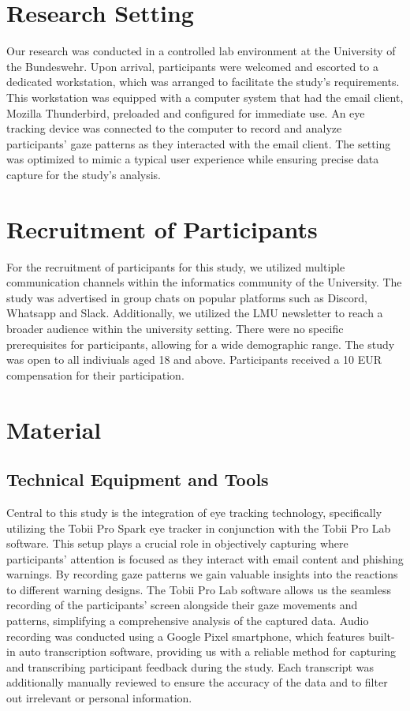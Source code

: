 \documentclass[
  a4paper,  %
  twoside,  %
  bibliography=totoc,
  headsepline,
  cleardoublepage=empty,
  parskip=half,
  draft=false
]{scrbook}
\begin{document}
\section{Research Setting}
Our research was conducted in a controlled lab environment at the University of the Bundeswehr. Upon arrival, participants were welcomed and escorted to a dedicated workstation, which was arranged to facilitate the study's requirements. This workstation was equipped with a computer system that had the email client, Mozilla Thunderbird, preloaded and configured for immediate use. An eye tracking device was connected to the computer to record and analyze participants' gaze patterns as they interacted with the email client. The setting was optimized to mimic a typical user experience while ensuring precise data capture for the study's analysis.

\section{Recruitment of Participants}
For the recruitment of participants for this study, we utilized multiple communication channels within the informatics community of the University. The study was advertised in group chats on popular platforms such as Discord, Whatsapp and Slack. Additionally, we utilized the LMU newsletter to reach a broader audience within the university setting. There were no specific prerequisites for participants, allowing for a wide demographic range. The study was open to all indiviuals aged 18 and above. Participants received a 10 EUR compensation for their participation.

\section{Material}
\subsection{Technical Equipment and Tools}
Central to this study is the integration of eye tracking technology, specifically utilizing the Tobii Pro Spark eye tracker in conjunction with the Tobii Pro Lab software. This setup plays a crucial role in objectively capturing where participants' attention is focused as they interact with email content and phishing warnings. By recording gaze patterns we gain valuable insights into the reactions to different warning designs. The Tobii Pro Lab software allows us the seamless recording of the participants' screen alongside their gaze movements and patterns, simplifying a comprehensive analysis of the captured data. \newline 
Audio recording was conducted using a Google Pixel smartphone, which features built-in auto transcription software, providing us with a reliable method for capturing and transcribing participant feedback during the study. Each transcript was additionally manually reviewed to ensure the accuracy of the data and to filter out irrelevant or personal information.
\end{document}
